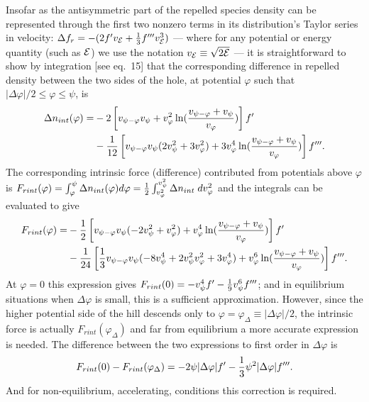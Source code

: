 \documentclass[aip,pop,article-title]{revtex4-2}
\def\energy{{\cal E}}
\begin{document}
Insofar as the antisymmetric part of the repelled species density can
be represented through the first two nonzero terms in its
distribution's Taylor series in velocity:
$\Delta f_r= -(2f' v_\energy+{1\over 3}f'''v_\energy^3)$ --- where for
any potential or energy quantity (such as $\energy$) we use the
notation $v_\energy\equiv \sqrt{2\energy}$ --- it is straightforward to
show by integration [see \citet{Hutchinson2021d} eq.\ 15] that the
corresponding difference in repelled density between the two sides of
the hole, at potential $\varphi$ such that
$|\Delta\varphi|/2\le \varphi\le {\psi}$, is
\begin{equation}
  \label{eq:Dnint}
  \begin{split}
  \Delta n_{int}(\varphi) =& -2\left[v_{{\psi}-\varphi} v_{{\psi}} +v_\varphi^2\ln({v_{{\psi}-\varphi}+v_{{\psi}}\over v_\varphi})\right]f'\\
  &-{1\over 12}\left[v_{{\psi}-\varphi} v_{{\psi}}(2v_{{\psi}}^2+3v_\varphi^2)+3v_\varphi^4 \ln({v_{{\psi}-\varphi}+v_{{\psi}}\over v_\varphi})\right]f'''.
  \end{split}
\end{equation}
The corresponding intrinsic force (difference) contributed from
potentials above
$\varphi$ is
$F_{rint}(\varphi)=\int_\varphi^\psi \Delta n_{int}(\varphi) d\varphi = {1\over
  2}\int_{v_{\varphi}^2}^{v_\psi^2} \Delta n_{int}\; dv_\varphi^2$
and the integrals can be evaluated to give
\begin{equation}
  \label{eq:int2}\begin{split}
    F_{rint}(\varphi)  =&-{1\over 2}\left[
      v_{{{\psi}}-\varphi}v_{{\psi}}(-2v_{{\psi}}^2+v_\varphi^2)+
      v_\varphi^4\ln({v_{{{\psi}}-\varphi}+v_{{\psi}}\over v_\varphi})\right]f'
    \\
    &-{1\over 24}\left[{1\over3}
      v_{{{\psi}}-\varphi}v_{{\psi}}(-8v_{{\psi}}^4+2v_{{\psi}}^2
      v_\varphi^2+3v_\varphi^4)
      +v_\varphi^6\ln({v_{{{\psi}}-\varphi}+v_{{\psi}}\over
        v_\varphi})\right]f'''.
  \end{split}
\end{equation}
At $\varphi=0$ this expression gives
$F_{rint}(0)=-v_{{\psi}}^4f' -{1\over 9}v_{{\psi}}^6f'''$; and in
equilibrium situations when $\Delta\varphi$ is small, this is a
sufficient approximation.  However, since the higher potential side of
the hill descends only to
$\varphi=\varphi_\Delta\equiv |\Delta\varphi|/2$, the intrinsic force
is actually $F_{rint}(\varphi_\Delta)$ and far from equilibrium a
more accurate expression is needed. The difference between the two
expressions to first order in $\Delta\varphi$ is
\begin{equation}\label{frintdiff}
  F_{rint}(0)-F_{rint}(\varphi_\Delta)=-2\psi|\Delta\varphi|f'
  -{1\over3}\psi^2|\Delta\varphi|f'''.
\end{equation}
And for non-equilibrium, accelerating, conditions this
correction is required.
\end{document}
